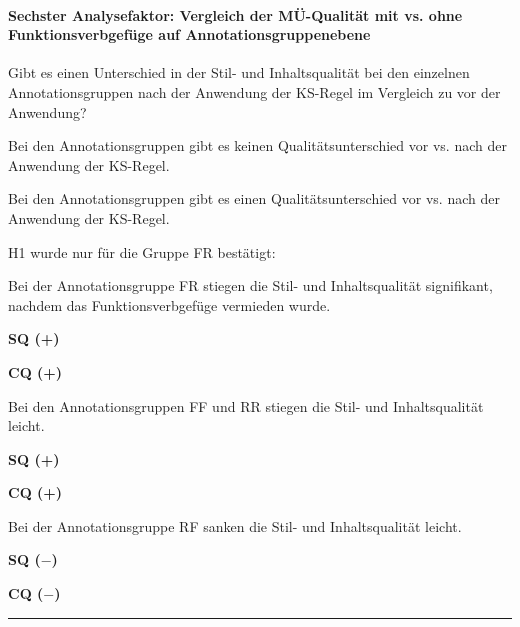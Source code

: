 \paragraph*{Sechster Analysefaktor: Vergleich der MÜ-Qualität mit vs. ohne Funktionsverbgefüge auf Annotationsgruppenebene}
\begin{description}[font=\normalfont\bfseries]
\item [Fragestellung:] Gibt es einen Unterschied in der Stil- und Inhaltsqualität bei den einzelnen Annotationsgruppen nach der Anwendung der KS-Regel im Vergleich zu vor der Anwendung?
\item [H0 --] Bei den Annotationsgruppen gibt es keinen Qualitätsunterschied vor vs. nach der Anwendung der KS-Regel.
\item [H1 --] Bei den Annotationsgruppen gibt es einen Qualitätsunterschied vor vs. nach der Anwendung der KS-Regel.
\item [Resultat]
\end{description}
\noindent
\parbox[t]{.8\textwidth}{H1 wurde nur für die Gruppe FR bestätigt:

Bei der Annotationsgruppe FR stiegen die Stil- und Inhaltsqualität signifikant, nachdem das Funktionsverbgefüge vermieden wurde.}
\parbox[t]{.04\textwidth}{}
\colorbox{smGreen}{\parbox[t]{.15\textwidth}{\textbf{SQ (+)}

 \textbf{CQ (+)}\vspace{25pt}}}

\medskip
\noindent
\parbox[t]{.8\textwidth}{Bei den Annotationsgruppen FF und RR stiegen die Stil- und Inhaltsqualität leicht.}
\parbox[t]{.04\textwidth}{}
\parbox[t]{.15\textwidth}{\textbf{SQ (+)}

 \textbf{CQ (+)}}

\medskip
\noindent
\parbox[t]{.8\textwidth}{Bei der Annotationsgruppe RF sanken die Stil- und Inhaltsqualität leicht.}
\parbox[t]{.04\textwidth}{}
\parbox[t]{.15\textwidth}{\textbf{SQ ($-$)}

 \textbf{CQ ($-$)}}
\hrule
